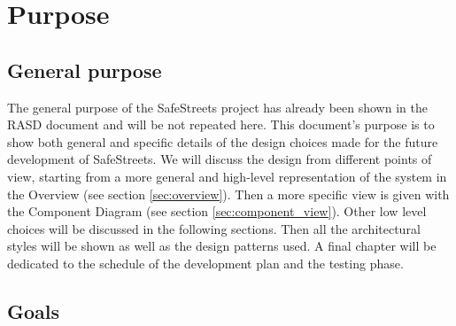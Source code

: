 \section{Purpose}
\subsection{General purpose}
The general purpose of the SafeStreets project has already been shown in the
RASD document and will be not repeated here. This document's purpose is to show
both general and specific details of the design choices made for the future
development of SafeStreets. We will discuss the design from different points of
view, starting from a more general and high-level representation of the system
in the Overview (see section \ref{sec:overview}). Then a more specific view is
given with the Component Diagram (see section \ref{sec:component_view}). Other
low level choices will be discussed in the following sections. Then all the
architectural styles will be shown as well as the design patterns used. A final
chapter will be dedicated to the schedule of the development plan and the
testing phase.

\subsection{Goals}

\begin{description}
\end{description}